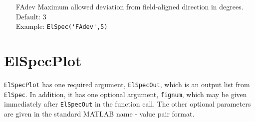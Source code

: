 \documentclass[12pt,a4paper]{report}
\begin{document}
\begin{itemize}
\item[FAdev] Maximum allowed deviation from field-aligned direction in degrees. \\
Default: 3\\
Example: \verb|ElSpec('FAdev',5)|

\end{itemize}



\section{ElSpecPlot}

\verb|ElSpecPlot| has one required argument, \verb|ElSpecOut|, which is an output list from \verb|ElSpec|. In addition, it has one optional argument, \verb|fignum|, which may be given immediately after \verb|ElSpecOut| in the function call. The other optional parameters are given in the standard MATLAB name - value pair format. 
\end{document}
